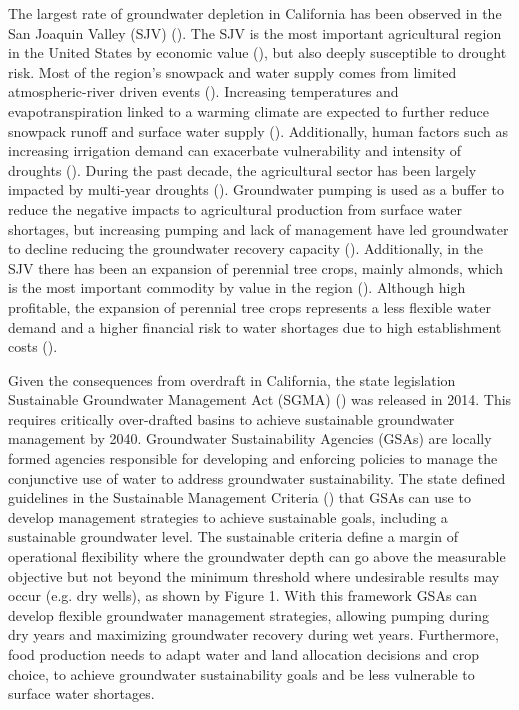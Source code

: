 \documentclass[11pt,a4paper]{article}
\begin{document}
The largest rate of groundwater depletion in California has been observed in the San Joaquin Valley (SJV) (\cite{ojha_sustained_2018}). The SJV is the most important agricultural region in the United States by economic value (\cite{usda_national_2020}), but also deeply susceptible to drought risk. Most of the region’s snowpack and water supply comes from limited atmospheric-river driven events (\cite{espinoza_global_2018}). Increasing temperatures and evapotranspiration linked to a warming climate are expected to further reduce snowpack runoff and surface water supply (\cite{fernandez-bou_regional_2021,vahmani_will_2022}). Additionally, human factors such as increasing irrigation demand can exacerbate vulnerability and intensity of droughts (\cite{he_intensification_2017}). During the past decade, the agricultural sector has been largely impacted by multi-year droughts (\cite{lund_lessons_2018,medellin-azuara_economic_2022}). Groundwater pumping is used as a buffer to reduce the negative impacts to agricultural production from surface water shortages, but increasing pumping and lack of management have led groundwater to decline reducing the groundwater recovery capacity (\cite{liu_groundwater_2022}).  Additionally, in the SJV there has been an expansion of perennial tree crops, mainly almonds, which is the most important commodity by value in the region (\cite{usda_national_2020}). Although high profitable, the expansion of perennial tree crops represents a less flexible water demand and a higher financial risk to water shortages due to high establishment costs (\cite{mall_water_2019,qin_flexibility_2019}).   

Given the consequences from overdraft in California, the state legislation Sustainable Groundwater Management Act (SGMA) (\cite{dwr_sustainable_2021}) was released in 2014. This requires critically over-drafted basins to achieve sustainable groundwater management by 2040. Groundwater Sustainability Agencies (GSAs) are locally formed agencies responsible for developing and enforcing policies to manage the conjunctive use of water to address groundwater sustainability. The state defined guidelines in the Sustainable Management Criteria (\cite{dwr_sustainable_2017}) that GSAs can use to develop management strategies to achieve sustainable goals, including a sustainable groundwater level. The sustainable criteria define a margin of operational flexibility where the groundwater depth can go above the measurable objective but not beyond the minimum threshold where undesirable results may occur (e.g. dry wells), as shown by Figure 1. With this framework GSAs can develop flexible groundwater management strategies, allowing pumping during dry years and maximizing groundwater recovery during wet years. Furthermore, food production needs to adapt water and land allocation decisions and crop choice, to achieve groundwater sustainability goals and be less vulnerable to surface water shortages.  
\end{document}
